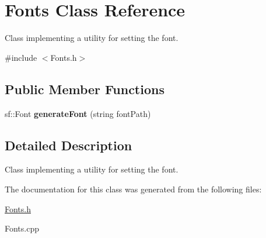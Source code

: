\hypertarget{classFonts}{}\section{Fonts Class Reference}
\label{classFonts}


Class implementing a utility for setting the font.  




{\ttfamily \#include $<$Fonts.\+h$>$}

\subsection*{Public Member Functions}
\begin{DoxyCompactItemize}
\item 
\hypertarget{classFonts_a0f9626637c82bd19377567c2e6d4f940}{}\label{classFonts_a0f9626637c82bd19377567c2e6d4f940} 
sf\+::\+Font {\bfseries generate\+Font} (string font\+Path)
\end{DoxyCompactItemize}


\subsection{Detailed Description}
Class implementing a utility for setting the font. 

The documentation for this class was generated from the following files\+:\begin{DoxyCompactItemize}
\item 
\hyperlink{Fonts_8h}{Fonts.\+h}\item 
Fonts.\+cpp\end{DoxyCompactItemize}
